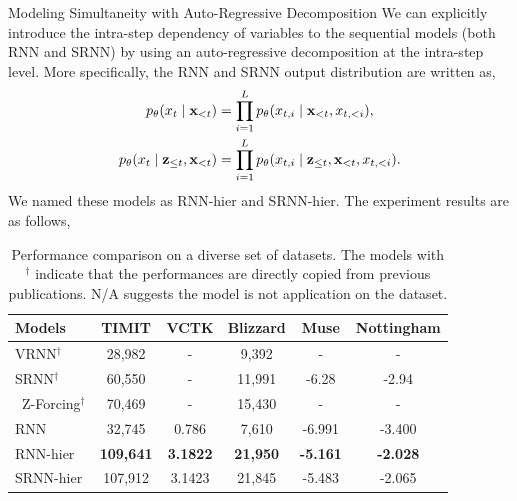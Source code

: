\documentclass[final]{beamer}
\newlength{\colwidth}
\begin{document}
\begin{frame}[t]
\begin{columns}[t]
\begin{column}{\colwidth}
  \begin{block}{Modeling Simultaneity with Auto-Regressive Decomposition}
	We can explicitly introduce the intra-step dependency of variables to the sequential models (both RNN and SRNN) by using an auto-regressive decomposition at the intra-step level. More specifically, the RNN and SRNN output distribution are written as,
	\begin{align}
	\label{eqn:ar_rnn_out_dist}
	p_\theta(x_t \mid {\mathbf{x}}_{<t})
	&= \prod_{i=1}^{L} p_{\theta}(x_{t,i} \mid {\mathbf{x}}_{<t}, x_{t,<i}), \\
	\label{eqn:ar_srnn_out_dist}
	p_\theta(x_t \mid {\mathbf{z}}_{\le t}, {\mathbf{x}}_{<t})
	&= \prod_{i=1}^{L} p_{\theta}(x_{t,i} \mid {\mathbf{z}}_{\le t}, {\mathbf{x}}_{<t}, x_{t,<i}).
	\end{align}
	We named these models as RNN-hier and SRNN-hier. The experiment results are as follows,
	\begin{table}[!t]
		\centering
		\small
			\begin{tabular}{l|c c c | c c }
				\toprule
				\bf Models          & \bf TIMIT & \bf VCTK  & \bf Blizzard  & \bf Muse  & \bf Nottingham \\
				\midrule
				VRNN$^\dagger$\cite{chung2015recurrent}      & 28,982      & -          & 9,392      &  -         &  -      \\
				SRNN$^\dagger$\cite{fraccaro2016sequential}      & 60,550      & -          & 11,991     &  -6.28     &  -2.94     \\\
				Z-Forcing$^\dagger$\cite{goyal2017z}  & 70,469 & -          & 15,430     &  -         &  -       \\
				\midrule
				RNN               & 32,745      & 0.786      & 7,610     & -6.991     & -3.400     \\
				\midrule\midrule
				RNN-hier            & \bf 109,641     & \bf 3.1822     & \bf 21,950     & \textbf{-5.161} & \bf -2.028 \\
				SRNN-hier           & 107,912     & 3.1423     & 21,845     & -5.483     & -2.065    \\
				\bottomrule
			\end{tabular}
		\caption{Performance comparison on a diverse set of datasets. The models with $^\dagger$ indicate that the performances are directly copied from previous publications. N/A suggests the model is not application on the dataset. }
		\label{tab:non_factorized}
		\vspace{-1.5em}
	\end{table}
	\vspace{-1.0em}

\end{block}
\end{column}
\end{columns}
\end{frame}
\end{document}
